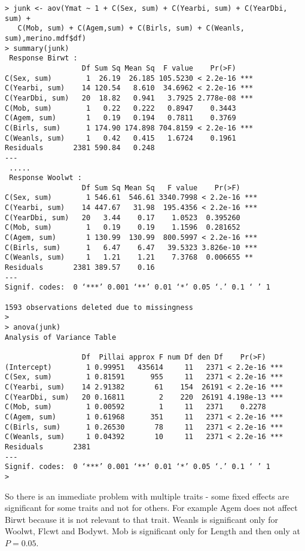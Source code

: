 \documentclass[titlepage]{article}  %
\begin{document}
\begin{verbatim}
> junk <- aov(Ymat ~ 1 + C(Sex, sum) + C(Yearbi, sum) + C(YearDbi, sum) +
   C(Mob, sum) + C(Agem,sum) + C(Birls, sum) + C(Weanls, sum),merino.mdf$df)
> summary(junk)
 Response Birwt :
                  Df Sum Sq Mean Sq  F value    Pr(>F)    
C(Sex, sum)        1  26.19  26.185 105.5230 < 2.2e-16 ***
C(Yearbi, sum)    14 120.54   8.610  34.6962 < 2.2e-16 ***
C(YearDbi, sum)   20  18.82   0.941   3.7925 2.778e-08 ***
C(Mob, sum)        1   0.22   0.222   0.8947    0.3443    
C(Agem, sum)       1   0.19   0.194   0.7811    0.3769    
C(Birls, sum)      1 174.90 174.898 704.8159 < 2.2e-16 ***
C(Weanls, sum)     1   0.42   0.415   1.6724    0.1961    
Residuals       2381 590.84   0.248                       
---
 .....
 Response Woolwt :
                  Df Sum Sq Mean Sq   F value    Pr(>F)    
C(Sex, sum)        1 546.61  546.61 3340.7998 < 2.2e-16 ***
C(Yearbi, sum)    14 447.67   31.98  195.4356 < 2.2e-16 ***
C(YearDbi, sum)   20   3.44    0.17    1.0523  0.395260    
C(Mob, sum)        1   0.19    0.19    1.1596  0.281652    
C(Agem, sum)       1 130.99  130.99  800.5997 < 2.2e-16 ***
C(Birls, sum)      1   6.47    6.47   39.5323 3.826e-10 ***
C(Weanls, sum)     1   1.21    1.21    7.3768  0.006655 ** 
Residuals       2381 389.57    0.16                        
---
Signif. codes:  0 ‘***’ 0.001 ‘**’ 0.01 ‘*’ 0.05 ‘.’ 0.1 ‘ ’ 1 

1593 observations deleted due to missingness
> 
> anova(junk)
Analysis of Variance Table

                  Df  Pillai approx F num Df den Df    Pr(>F)    
(Intercept)        1 0.99951   435614     11   2371 < 2.2e-16 ***
C(Sex, sum)        1 0.81591      955     11   2371 < 2.2e-16 ***
C(Yearbi, sum)    14 2.91382       61    154  26191 < 2.2e-16 ***
C(YearDbi, sum)   20 0.16811        2    220  26191 4.198e-13 ***
C(Mob, sum)        1 0.00592        1     11   2371    0.2278    
C(Agem, sum)       1 0.61968      351     11   2371 < 2.2e-16 ***
C(Birls, sum)      1 0.26530       78     11   2371 < 2.2e-16 ***
C(Weanls, sum)     1 0.04392       10     11   2371 < 2.2e-16 ***
Residuals       2381                                             
---
Signif. codes:  0 ‘***’ 0.001 ‘**’ 0.01 ‘*’ 0.05 ‘.’ 0.1 ‘ ’ 1 
> 
\end{verbatim}
So there is an immediate problem with multiple traits - some fixed effects are significant for some traits and not for others. For example Agem does not affect Birwt because it is not relevant to that trait. Weanls is significant only for Woolwt, Flcwt and Bodywt. Mob is significant only for Length and then only at $P=0.05$.
\end{document}

